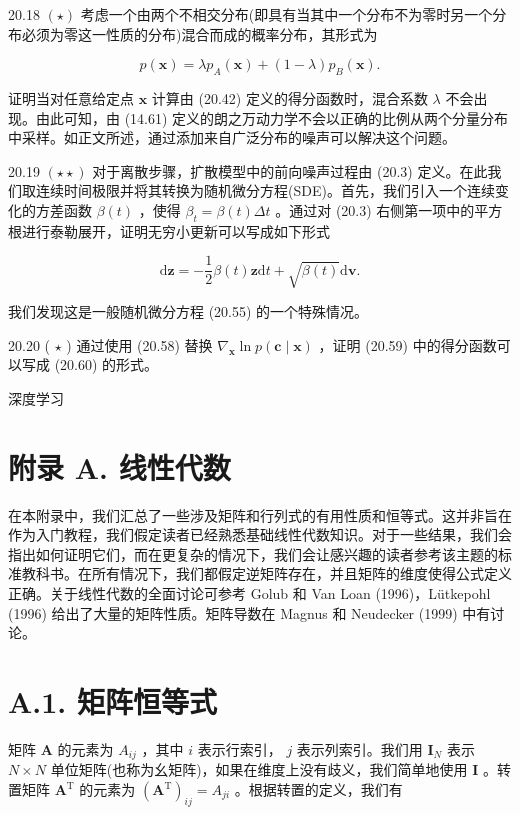 \documentclass[10pt]{report}
\begin{document}
20.18 \(\left( \star \right)\) 考虑一个由两个不相交分布(即具有当其中一个分布不为零时另一个分布必须为零这一性质的分布)混合而成的概率分布，其形式为

\[
p\left( \mathbf{x}\right)  = \lambda {p}_{A}\left( \mathbf{x}\right)  + \left( {1 - \lambda }\right) {p}_{B}\left( \mathbf{x}\right) . \tag{20.69}
\]

证明当对任意给定点 \(\mathbf{x}\) 计算由 (20.42) 定义的得分函数时，混合系数 \(\lambda\) 不会出现。由此可知，由 (14.61) 定义的朗之万动力学不会以正确的比例从两个分量分布中采样。如正文所述，通过添加来自广泛分布的噪声可以解决这个问题。

20.19 \(\left( {\star  \star  }\right)\) 对于离散步骤，扩散模型中的前向噪声过程由 (20.3) 定义。在此我们取连续时间极限并将其转换为随机微分方程(SDE)。首先，我们引入一个连续变化的方差函数 \(\beta \left( t\right)\) ，使得 \({\beta }_{t} = \beta \left( t\right) {\Delta t}\) 。通过对 (20.3) 右侧第一项中的平方根进行泰勒展开，证明无穷小更新可以写成如下形式

\[
\mathrm{d}\mathbf{z} =  - \frac{1}{2}\beta \left( t\right) \mathbf{z}\mathrm{d}t + \sqrt{\beta \left( t\right) }\mathrm{d}\mathbf{v}. \tag{20.70}
\]

我们发现这是一般随机微分方程 (20.55) 的一个特殊情况。

20.20 ( \(\star\) ) 通过使用 (20.58) 替换 \({\nabla }_{\mathbf{x}}\ln p\left( {\mathbf{c} \mid  \mathbf{x}}\right)\) ，证明 (20.59) 中的得分函数可以写成 (20.60) 的形式。

深度学习

\section*{附录 A. 线性代数}

在本附录中，我们汇总了一些涉及矩阵和行列式的有用性质和恒等式。这并非旨在作为入门教程，我们假定读者已经熟悉基础线性代数知识。对于一些结果，我们会指出如何证明它们，而在更复杂的情况下，我们会让感兴趣的读者参考该主题的标准教科书。在所有情况下，我们都假定逆矩阵存在，并且矩阵的维度使得公式定义正确。关于线性代数的全面讨论可参考 Golub 和 Van Loan (1996)，Lütkepohl (1996) 给出了大量的矩阵性质。矩阵导数在 Magnus 和 Neudecker (1999) 中有讨论。

\section*{A.1. 矩阵恒等式}

矩阵 \(\mathbf{A}\) 的元素为 \({A}_{ij}\) ，其中 \(i\) 表示行索引， \(j\) 表示列索引。我们用 \({\mathbf{I}}_{N}\) 表示 \(N \times  N\) 单位矩阵(也称为幺矩阵)，如果在维度上没有歧义，我们简单地使用 \(\mathbf{I}\) 。转置矩阵 \({\mathbf{A}}^{\mathrm{T}}\) 的元素为 \({\left( {\mathbf{A}}^{\mathrm{T}}\right) }_{ij} = {A}_{ji}\) 。根据转置的定义，我们有
\end{document}
